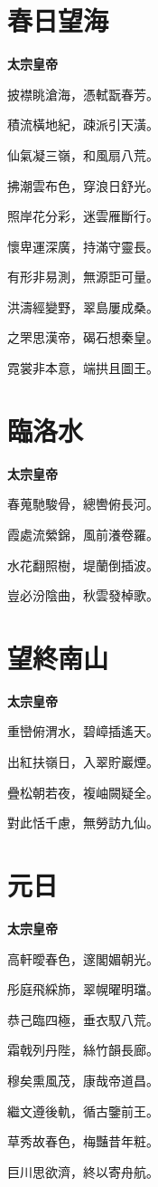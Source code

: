 \documentclass[12pt,a4paper]{ctexbook}
\begin{document}
\section{春日望海}
\textbf{太宗皇帝}\par\vspace{0.5em}
披襟眺滄海，憑軾翫春芳。\par
積流橫地紀，疎派引天潢。\par
仙氣凝三嶺，和風扇八荒。\par
拂潮雲布色，穿浪日舒光。\par
照岸花分彩，迷雲雁斷行。\par
懷卑運深廣，持滿守靈長。\par
有形非易測，無源詎可量。\par
洪濤經變野，翠島屢成桑。\par
之罘思漢帝，碣石想秦皇。\par
霓裳非本意，端拱且圖王。\par

\section{臨洛水}
\textbf{太宗皇帝}\par\vspace{0.5em}
春蒐馳駿骨，總轡俯長河。\par
霞處流縈錦，風前瀁卷羅。\par
水花翻照樹，堤蘭倒插波。\par
豈必汾陰曲，秋雲發棹歌。\par

\section{望終南山}
\textbf{太宗皇帝}\par\vspace{0.5em}
重巒俯渭水，碧嶂插遙天。\par
出紅扶嶺日，入翠貯巖煙。\par
疊松朝若夜，複岫闕疑全。\par
對此恬千慮，無勞訪九仙。\par

\section{元日}
\textbf{太宗皇帝}\par\vspace{0.5em}
高軒曖春色，邃閣媚朝光。\par
彤庭飛綵斾，翠幌曜明璫。\par
恭己臨四極，垂衣馭八荒。\par
霜戟列丹陛，絲竹韻長廊。\par
穆矣熏風茂，康哉帝道昌。\par
繼文遵後軌，循古鑒前王。\par
草秀故春色，梅豔昔年粧。\par
巨川思欲濟，終以寄舟航。\par
\end{document}
